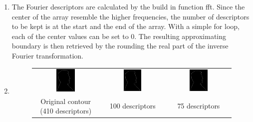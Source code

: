\documentclass[a4paper]{article}
\begin{document}
\begin{enumerate}
\item
The Fourier descriptors are calculated by the build in function fft.
Since the center of the array resemble the higher frequencies, the number of descriptors to be kept is at the start and the end of the array.
With a simple for loop, each of the center values can be set to 0.
The resulting approximating boundary is then retrieved by the rounding the real part of the inverse Fourier transformation.


\item

\begin{figure}[H]
\centering
\begin{tabular}{ccc}
    \includegraphics[width=0.3\textwidth]{../lab5ex3/contour-410.png} & \includegraphics[width=0.3\textwidth]{../lab5ex3/contour-100.png} & \includegraphics[width=0.3\textwidth]{../lab5ex3/contour-75.png} \\
    Original contour (410 descriptors) & 100 descriptors & 75 descriptors \\

\end{tabular}
\end{figure}
\end{enumerate}
\end{document}
